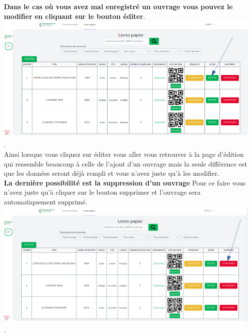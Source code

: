 \documentclass[12pt,a4paper]{article}
\begin{document}
\newpage

\textbf{Dans le cas où vous avez mal enregistré un ouvrage vous pouvez le modifier en cliquant sur le bouton éditer}.\\

\includegraphics[scale=0.5]{images/ResulEdit.png}.\\

Ainsi lorsque vous cliquez sur éditer vous aller vous retrouver à la page d'édition qui ressemble beaucoup à celle de l'ajout d'un ouvrage mais la seule différence est que les données seront déjà rempli et vous n'avez juste qu'à les modifier. \\

\textbf{La dernière possibilité est la suppression d'un ouvrage}
Pour ce faire vous n'avez juste qu'à cliquer sur le bouton supprimer et l'ouvrage sera automatiquement supprimé.\\

\includegraphics[scale=0.5]{images/ResulSuppression.png}.\\

\newpage
\end{document}
